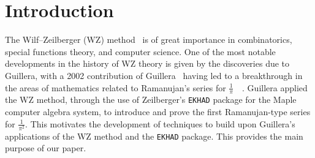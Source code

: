 \documentclass[12pt]{article}
\begin{document}
\section{Introduction}
 The Wilf--Zeilberger (WZ) method~\cite{PetkovsekWilfZeilberger1996} is of great importance in combinatorics, special functions theory, 
 and computer science. One of the most notable developments in the history of WZ theory is given by the discoveries due to Guillera, 
 with a 2002 contribution of Guillera~\cite{Guillera2002} having led to a breakthrough in the areas of mathematics related to Ramanujan's 
 series for $\frac{1}{\pi}$~\cite[pp.\ 352--354]{Berndt1994PartIV}~\cite{Ramanujan1914}. Guillera applied the WZ method, 
 through the use of Zeilberger's {\tt EKHAD} package for the Maple computer algebra system, to introduce and prove the first 
 Ramanujan-type series for $\frac{1}{\pi^2}$. This motivates the development of techniques to build upon Guillera's applications of the 
 WZ method and the {\tt EKHAD} package. This provides the main purpose of our paper. 
\end{document}
